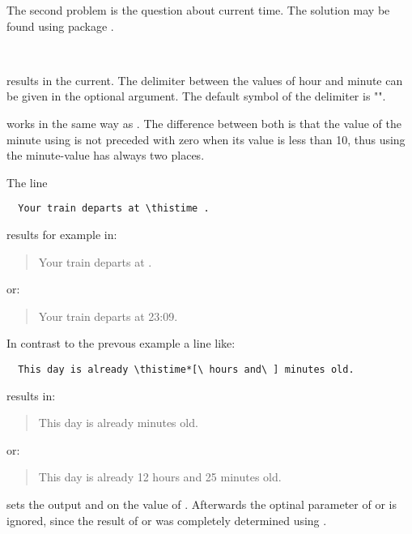 The second problem is the question about current time. The solution may be
found using package .

\begin{Declaration}%
  \\
\end{Declaration}%
%
 results in the current.
The delimiter between the values of hour and minute 
can be given in the optional argument.
The default symbol of the delimiter is "\PValue{:}".

 works in the same way as .
The difference between both is that the value of the minute
using  is not preceded with zero when its value
is less than 10, thus using  the minute-value
has always two places.
\begin{Example}
  The line
\begin{lstlisting}
  Your train departs at \thistime .
\end{lstlisting}
  results for example in:
  \begin{quote}
    Your train departs at \thistime .
  \end{quote}
  or:
  \begin{quote}
    Your train departs at 23:09.
  \end{quote}
  \bigskip
  In contrast to the prevous example a line like:
\begin{lstlisting}
  This day is already \thistime*[\ hours and\ ] minutes old.
\end{lstlisting}
  results in:
  \begin{quote}
    This day is already  minutes old.
  \end{quote}
  or:
  \begin{quote}
    This day is already 12 hours and 25 minutes old.
  \end{quote}
\end{Example}

\begin{Declaration}%
\end{Declaration}%
%
 sets the output  and
 on the value of .
Afterwards the optinal parameter of  or
 is ignored, since the result
of  or 
was completely determined using .%

